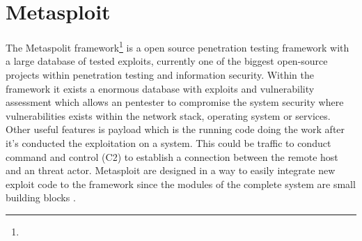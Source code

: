 \section{Metasploit}
\label{s:HowMetasploitWorks}
The Metaspolit framework\footnote{} is a open source penetration testing framework with a large database of tested exploits, currently one of the biggest open-source projects within penetration testing and information security. Within the framework it exists a enormous database with exploits and vulnerability assessment which allows an pentester to compromise the system security where vulnerabilities exists within the network stack, operating system or services. Other useful features is payload which is the running code doing the work after it's conducted the exploitation on a system. This could be traffic to conduct command and control (C2) to establish a connection between the remote host and an threat actor. Metasploit are designed in a way to easily integrate new exploit code to the framework since the modules of the complete system are small building blocks \autocite{MetasploitBook}.